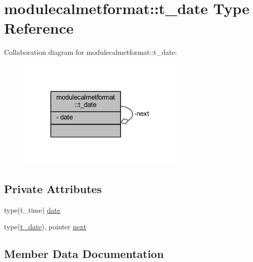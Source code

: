 \hypertarget{structmodulecalmetformat_1_1t__date}{}\section{modulecalmetformat\+:\+:t\+\_\+date Type Reference}
\label{structmodulecalmetformat_1_1t__date}


Collaboration diagram for modulecalmetformat\+:\+:t\+\_\+date\+:\nopagebreak
\begin{figure}[H]
\begin{center}
\leavevmode
\includegraphics[width=227pt]{structmodulecalmetformat_1_1t__date__coll__graph}
\end{center}
\end{figure}
\subsection*{Private Attributes}
\begin{DoxyCompactItemize}
\item 
type(t\+\_\+time) \mbox{\hyperlink{structmodulecalmetformat_1_1t__date_a6b338ea357f01d47b0a07cdba92ce267}{date}}
\item 
type(\mbox{\hyperlink{structmodulecalmetformat_1_1t__date}{t\+\_\+date}}), pointer \mbox{\hyperlink{structmodulecalmetformat_1_1t__date_a8d919a034cc3b449d05cd32766ec1810}{next}}
\end{DoxyCompactItemize}


\subsection{Member Data Documentation}
\mbox{\label{structmodulecalmetformat_1_1t__date_a6b338ea357f01d47b0a07cdba92ce267}} 

